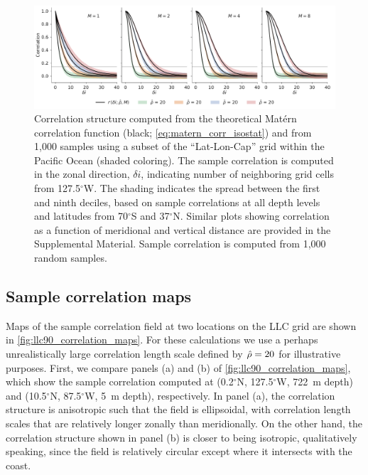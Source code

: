 \begin{figure}
    \centering
    \includegraphics[width=\textwidth]{../figures/matern_llc90_correlation_theory_vs_m_ix.pdf}
    \caption{Correlation structure computed from the theoretical Mat\'ern
        correlation function (black; \cref{eq:matern_corr_isostat}) and from
        1,000 samples using a subset of the ``Lat-Lon-Cap'' grid within the
        Pacific Ocean (shaded coloring).
        The sample correlation is computed in the zonal direction, $\delta i$,
        indicating number of neighboring grid cells from
        127.5$^\circ$W.
        The shading indicates the spread between the first and ninth deciles,
        based on sample correlations at all depth levels and latitudes from
        70$^\circ$S and 37$^\circ$N.
        Similar plots showing correlation as a function of meridional and
        vertical distance are provided in the Supplemental Material.
        Sample correlation is computed from 1,000 random samples.
    }
    \label{fig:llc90_correlations}
\end{figure}

\subsection{Sample correlation maps}
\label{ssec:llc90_correlation_maps}

Maps of the sample correlation field at two locations on the LLC
grid are shown in
\cref{fig:llc90_correlation_maps}.
For these calculations we use a perhaps unrealistically large correlation length scale
defined by $\hat{\rho}=20$ for illustrative purposes.
First, we compare panels (a) and (b) of \cref{fig:llc90_correlation_maps}, which
show the sample correlation computed at
(0.2$^\circ$N, 127.5$^\circ$W, 722~m depth) and
(10.5$^\circ$N, 87.5$^\circ$W, 5~m depth), respectively.
In panel (a), the correlation structure is anisotropic such that the field is
ellipsoidal, with correlation length scales that are
relatively longer zonally than meridionally.
On the other hand, the correlation structure shown in panel (b) is closer to
being isotropic, qualitatively speaking, since the field is relatively circular
except where it intersects with the coast.

